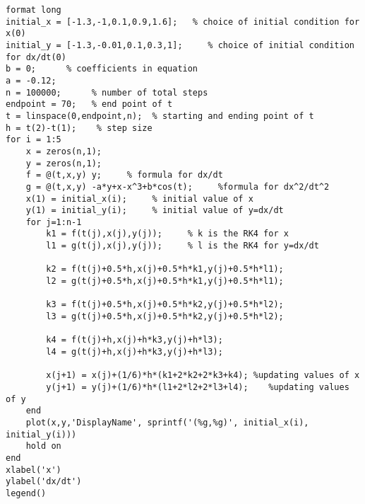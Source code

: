 \lstset{basicstyle=\footnotesize,style=myCustomMatlabStyle}
\begin{lstlisting}
format long
initial_x = [-1.3,-1,0.1,0.9,1.6];   % choice of initial condition for x(0)
initial_y = [-1.3,-0.01,0.1,0.3,1];     % choice of initial condition for dx/dt(0)
b = 0;      % coefficients in equation
a = -0.12;
n = 100000;      % number of total steps
endpoint = 70;   % end point of t 
t = linspace(0,endpoint,n);  % starting and ending point of t
h = t(2)-t(1);    % step size
for i = 1:5
    x = zeros(n,1);
    y = zeros(n,1);
    f = @(t,x,y) y;     % formula for dx/dt
    g = @(t,x,y) -a*y+x-x^3+b*cos(t);     %formula for dx^2/dt^2
    x(1) = initial_x(i);     % initial value of x
    y(1) = initial_y(i);     % initial value of y=dx/dt
    for j=1:n-1
        k1 = f(t(j),x(j),y(j));     % k is the RK4 for x
        l1 = g(t(j),x(j),y(j));     % l is the RK4 for y=dx/dt

        k2 = f(t(j)+0.5*h,x(j)+0.5*h*k1,y(j)+0.5*h*l1);
        l2 = g(t(j)+0.5*h,x(j)+0.5*h*k1,y(j)+0.5*h*l1);

        k3 = f(t(j)+0.5*h,x(j)+0.5*h*k2,y(j)+0.5*h*l2);
        l3 = g(t(j)+0.5*h,x(j)+0.5*h*k2,y(j)+0.5*h*l2);

        k4 = f(t(j)+h,x(j)+h*k3,y(j)+h*l3);
        l4 = g(t(j)+h,x(j)+h*k3,y(j)+h*l3);

        x(j+1) = x(j)+(1/6)*h*(k1+2*k2+2*k3+k4); %updating values of x
        y(j+1) = y(j)+(1/6)*h*(l1+2*l2+2*l3+l4);    %updating values of y
    end
    plot(x,y,'DisplayName', sprintf('(%g,%g)', initial_x(i), initial_y(i)))
    hold on
end
xlabel('x')
ylabel('dx/dt')
legend()

\end{lstlisting}